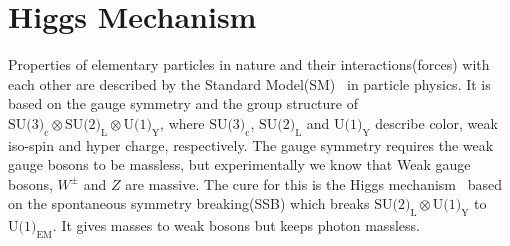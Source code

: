 \section{Higgs Mechanism}

Properties of elementary particles in nature and their interactions(forces)
with each other are described by the Standard 
Model(SM)~\cite{Glashow:1961tr,Weinberg:1967tq,Salam:1963tr} 
in particle physics. It is 
based on the gauge symmetry and the group structure of 
$\textrm{SU(3)}_\textrm{c} \otimes \textrm{SU(2)}_\textrm{L} 
\otimes \textrm{U(1)}_\textrm{Y}$, where  $\textrm{SU(3)}_\textrm{c}$, 
$\textrm{SU(2)}_\textrm{L}$ and $\textrm{U(1)}_\textrm{Y}$  
describe color, weak iso-spin and hyper charge, respectively. 
The gauge symmetry requires the weak gauge bosons to be massless,
but experimentally we know that Weak gauge bosons, $W^\pm$ and $Z$ are massive. 
The cure for this is the Higgs 
mechanism~\cite{Englert:1964et,Higgs:1964ia,Higgs:1964pj,Guralnik:1964eu,Higgs:1966ev, Kibble:1967sv}
based on the spontaneous symmetry breaking(SSB)
which breaks $\textrm{SU(2)}_\textrm{L} \otimes \textrm{U(1)}_\textrm{Y}$
to $\textrm{U(1)}_{\textrm{EM}}$. It gives masses to weak bosons but keeps photon massless. 



